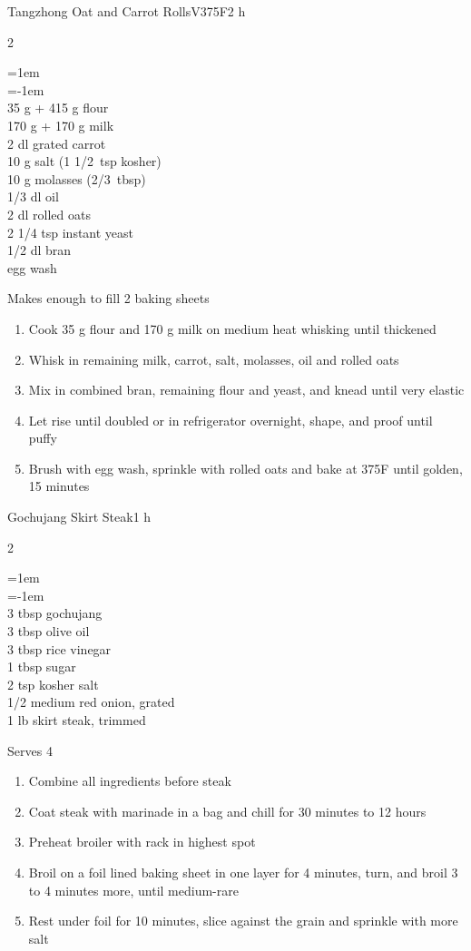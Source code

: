 \documentclass{article}
\newenvironment{recipe}[3][]
    {\begin{cardbase}[#1]{#2}{#3}
    \columnratio{0.333}
    \begin{paracol}{2}}
    {\end{paracol}\end{cardbase}}
\newenvironment{denserecipe}[3][]
    {\small
    \begin{recipe}[#1]{#2}{#3}}
    {\end{recipe}}
\newcommand{\nextcolumn}{\switchcolumn}
\newenvironment{ingredients}
    {
    \begin{obeylines}
    \vspace{\parskip}
    \setlength{\parskip}{0.25em}
    \vspace{-0.25em}
    \leftskip=1em
    \parindent=-1em}
    {\end{obeylines}}
\newenvironment{steps}
    {\begin{enumerate}[leftmargin=*,topsep=0pt]}
    {\end{enumerate}}
\newcommand{\fahrenheit}[1]{#1\textdegree{}F}
\newcommand{\tag}[1]{\hspace{1em}#1}
\newcommand{\symboltag}[2]{\tag{#1\hspace{0.4em}#2}}
\newcommand{\totaltime}[1]{\symboltag{\raisebox{-0.1em}{\small\StopWatchEnd}}{#1}}
\newcommand{\preheat}[1]{\symboltag{\Topbottomheat}{#1}}
\begin{document}
\begin{denserecipe}{Tangzhong Oat and Carrot Rolls}{\tag{V}\preheat{\fahrenheit{375}}\totaltime{2 h}}
\begin{ingredients}
35 g + 415 g flour
170 g + 170 g milk
2 dl grated carrot
10 g salt (1 1/2~tsp kosher)
10 g molasses (2/3~tbsp)
1/3 dl oil
2 dl rolled oats
2 1/4 tsp instant yeast
1/2 dl bran
egg wash
\end{ingredients}
\nextcolumn
Makes enough to fill 2 baking sheets
\begin{steps}
    \item Cook 35 g flour and 170 g milk on medium heat whisking until thickened
    \item Whisk in remaining milk, carrot, salt, \mbox{molasses}, oil and rolled oats
    \item Mix in combined bran, remaining flour and yeast, and knead until very elastic
    \item Let rise until doubled or in refrigerator overnight, shape, and proof until puffy
    \item Brush with egg wash, sprinkle with rolled oats and bake at \fahrenheit{375} until golden, 15 minutes
\end{steps}
\end{denserecipe}

\begin{recipe}{Gochujang Skirt Steak}{\totaltime{1 h}}
\begin{ingredients}
3 tbsp gochujang
3 tbsp olive oil
3 tbsp rice vinegar
1 tbsp sugar
2 tsp kosher salt
1/2 medium red onion, grated
1 lb skirt steak, trimmed
\end{ingredients}
\nextcolumn
Serves 4
\begin{steps}
    \item Combine all ingredients before steak
    \item Coat steak with marinade in a bag and chill for 30 minutes to 12 hours
    \item Preheat broiler with rack in highest spot
    \item Broil on a foil lined baking sheet in one layer for 4 minutes, turn, and broil 3 to 4 minutes more, until medium-rare
    \item Rest under foil for 10 minutes, slice against the grain and sprinkle with more salt
\end{steps}
\end{recipe}
\end{document}
